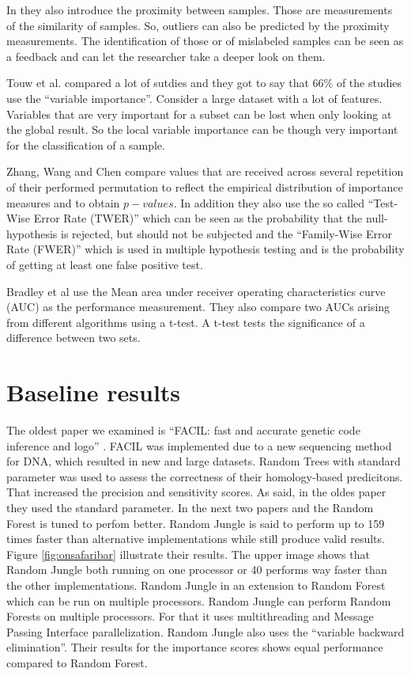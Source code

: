\documentclass{sig-alternate-05-2015}
\begin{document}
In \cite{schwarz2010safari} they also introduce the proximity between samples. Those are measurements of the similarity of samples. So, outliers can also be predicted by the proximity measurements. The identification of those or of mislabeled samples can be seen as a feedback and can let the researcher take a deeper look on them.

Touw et al. compared a lot of sutdies and they got to say that 66\% of the studies use the ``variable importance''. Consider a large dataset with a lot of features. Variables that are very important for a subset can be lost when only looking at the global result. So the local variable importance can be though very important for the classification of a sample.

Zhang, Wang and Chen \cite{zhang2009willows} compare values that are received across several repetition of their performed permutation to reflect the empirical distribution of importance measures and to obtain $p-values$. In addition they also use the so called ``Test-Wise Error Rate (TWER)'' which can be seen as the probability that the null-hypothesis is rejected, but should not be subjected and the ``Family-Wise Error Rate (FWER)'' which is used in multiple hypothesis testing and is the probability of getting at least one false positive test.

Bradley et al \cite{maken2014multiple} use the Mean area under receiver operating characteristics curve (AUC) as the performance measurement. They also compare two AUCs arising from different algorithms using a t-test. A t-test tests the significance of a difference between two sets.

\section{Baseline results}
The oldest paper we examined is ``FACIL: fast and accurate genetic code inference and logo'' \cite{dutilh2011facil}. FACIL was implemented due to a new sequencing method for DNA, which resulted in new and large datasets. Random Trees with standard parameter was used to assess the correctness of their homology-based predicitons. That increased the precision and sensitivity scores. 
As said, in the oldes paper they used the standard parameter. In the next two papers \cite{schwarz2010safari} and \cite{zhang2009willows} the Random Forest is tuned to perfom better.
Random Jungle is said to perform up to 159 times faster than alternative implementations while still produce valid results. Figure \ref{fig:onsafaribar} illustrate their results. The upper image shows that Random Jungle both running on one processor or 40 performs way faster than the other implementations. Random Jungle in an extension to Random Forest which can be run on multiple processors. Random Jungle can perform Random Forests on multiple processors. For that it uses multithreading and Message Passing Interface parallelization. Random Jungle also uses the ``variable backward elimination''. Their results for the importance scores shows equal performance compared to Random Forest.
\end{document}
